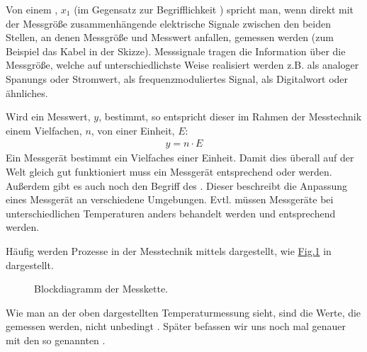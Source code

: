 \documentclass[letterpaper,10pt,english]{jupyterBook}
\let\sphinxpxdimen\pdfpxdimen\else\newdimen\sphinxpxdimen
\begin{document}
\sphinxAtStartPar
Von einem , \(x_1\) (im Gegensatz zur Begrifflichkeit ) spricht man, wenn direkt mit der Messgröße zusammenhängende elektrische Signale zwischen den beiden Stellen, an denen Messgröße und Messwert anfallen, gemessen werden (zum Beispiel das Kabel in der Skizze). Messsignale tragen die Information über die Messgröße, welche auf unterschiedlichste Weise realisiert werden z.B. als analoger Spanungs\sphinxhyphen{} oder Stromwert, als frequenzmoduliertes Signal, als Digitalwort oder ähnliches.

\sphinxAtStartPar
Wird ein Messwert, \(y\), bestimmt, so entspricht dieser im Rahmen der Messtechnik einem Vielfachen, \(n\), von einer Einheit, \(E\):
\begin{equation*}
\begin{split} y = n \cdot E\end{split}
\end{equation*}
\sphinxAtStartPar
Ein Messgerät bestimmt ein Vielfaches einer Einheit. Damit dies überall auf der Welt gleich gut funktioniert muss ein Messgerät entsprechend  oder  werden.
Außerdem gibt es auch noch den Begriff des . Dieser beschreibt die Anpassung eines Messgerät an verschiedene Umgebungen. Evtl. müssen Messgeräte bei unterschiedlichen Temperaturen anders behandelt werden und entsprechend  werden.

\sphinxAtStartPar
Häufig werden Prozesse in der Messtechnik mittels  dargestellt, wie \hyperref[\detokenize{content/1_Messen_Einheit:messsystem-block}]{Fig.\@ \ref{\detokenize{content/1_Messen_Einheit:messsystem-block}}} in dargestellt.

\begin{figure}[htbp]
\centering
\capstart

\noindent\sphinxincludegraphics[width=600\sphinxpxdimen]{{messsystem}.jpg}
\caption{Blockdiagramm der Messkette.}\label{\detokenize{content/1_Messen_Einheit:messsystem-block}}\end{figure}

\sphinxAtStartPar
Wie man an der oben dargestellten Temperaturmessung sieht, sind die Werte, die gemessen werden, nicht unbedingt . Später befassen wir uns noch mal genauer mit den so genannten {\hyperref[\detokenize{content/1_Messunsicherheiten::doc}]{}}.
\end{document}
